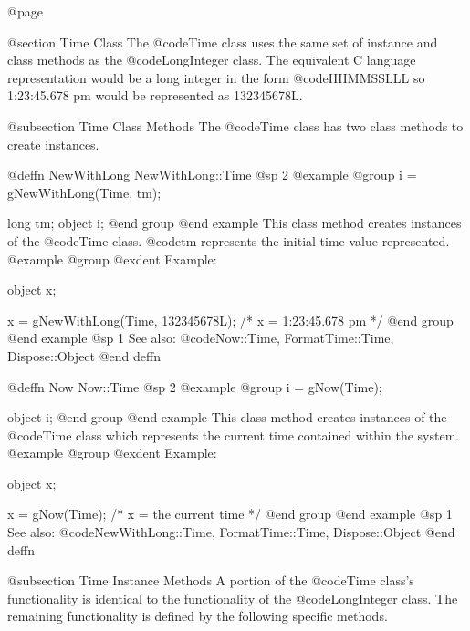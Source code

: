 @page

@section Time Class
The @code{Time} class uses the same set of instance and class
methods as the @code{LongInteger} class.  The equivalent C language
representation would be a long integer in the form @code{HHMMSSLLL}
so 1:23:45.678 pm would be represented as 132345678L.





@subsection Time Class Methods
The @code{Time} class has two class methods to create instances.






@deffn {NewWithLong} NewWithLong::Time
@sp 2
@example
@group
i = gNewWithLong(Time, tm);

long    tm;
object  i;
@end group
@end example
This class method creates instances of the @code{Time} class.  @code{tm}
represents the initial time value represented.
@example
@group
@exdent Example:

object  x;

x = gNewWithLong(Time, 132345678L);  /* x = 1:23:45.678 pm  */
@end group
@end example
@sp 1
See also:  @code{Now::Time, FormatTime::Time, Dispose::Object}
@end deffn










@deffn {Now} Now::Time
@sp 2
@example
@group
i = gNow(Time);

object  i;
@end group
@end example
This class method creates instances of the @code{Time} class which
represents the current time contained within the system.
@example
@group
@exdent Example:

object  x;

x = gNow(Time);   /*  x = the current time  */
@end group
@end example
@sp 1
See also:  @code{NewWithLong::Time, FormatTime::Time, Dispose::Object}
@end deffn










@subsection Time Instance Methods
A portion of the @code{Time} class's functionality is identical to
the functionality of the @code{LongInteger} class.  The remaining
functionality is defined by the following specific methods.







